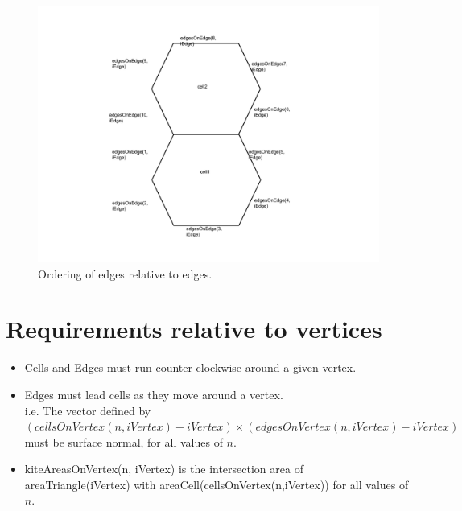 \documentclass[11pt]{report}
\begin{document}
\begin{figure}
	\centering
	\includegraphics[scale=0.4]{figures/EdgeOnEdge Diagram.pdf}
	\caption{Ordering of edges relative to edges.}
\end{figure}

\section{Requirements relative to vertices}

\begin{itemize}
	\item Cells and Edges must run counter-clockwise around a given vertex.
	\item Edges must lead cells as they move around a vertex. \\
		  i.e. The vector defined by  \\
		  {\small $(cellsOnVertex(n, iVertex) - iVertex) \times (edgesOnVertex(n, iVertex) - iVertex)$} \\
		  must be surface normal, for all values of $n$.
	\item kiteAreasOnVertex(n, iVertex) is the intersection area of areaTriangle(iVertex) with areaCell(cellsOnVertex(n,iVertex)) for all values of $n$.
\end{itemize}
\end{document}
